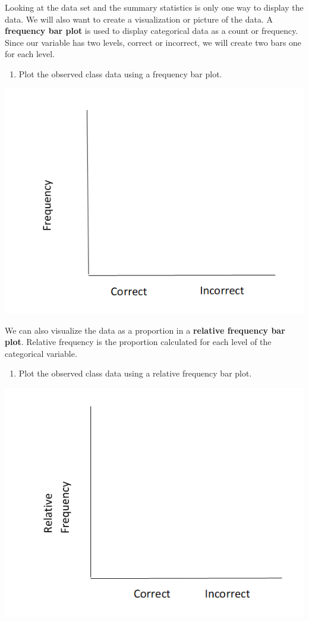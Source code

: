 \documentclass[
]{report}
\providecommand{\tightlist}{%
  \setlength{\itemsep}{0pt}\setlength{\parskip}{0pt}}
\begin{document}
\newpage

Looking at the data set and the summary statistics is only one way to display the data. We will also want to create a visualization or picture of the data. A \textbf{frequency bar plot} is used to display categorical data as a count or frequency. Since our variable has two levels, correct or incorrect, we will create two bars one for each level.

\begin{enumerate}
\def\labelenumi{\arabic{enumi}.}
\setcounter{enumi}{6}
\tightlist
\item
  Plot the observed class data using a frequency bar plot.
\end{enumerate}

\begin{flushleft}\includegraphics[width=0.75\linewidth]{images/barplot_martian} \end{flushleft}

We can also visualize the data as a proportion in a \textbf{relative frequency bar plot}. Relative frequency is the proportion calculated for each level of the categorical variable.

\begin{enumerate}
\def\labelenumi{\arabic{enumi}.}
\setcounter{enumi}{7}
\tightlist
\item
  Plot the observed class data using a relative frequency bar plot.
\end{enumerate}

\begin{flushleft}\includegraphics[width=0.75\linewidth]{images/relative_barplot_martian} \end{flushleft}
\end{document}
